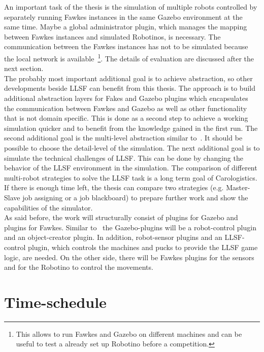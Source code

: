 \documentclass[a4paper,11pt]{article}
\begin{document}
An important task of the thesis is the simulation of multiple robots controlled by separately running Fawkes instances in the same Gazebo environment at the same time. Maybe a global administrator plugin, which manages the mapping between Fawkes instances and simulated Robotinos, is necessary. The communication between the Fawkes instances has not to be simulated because the local network is available~\footnote{This allows to run Fawkes and Gazebo on different machines and can be useful to test a already set up Robotino before a competition.}. The details of evaluation are discussed after the next section.\\
The probably most important additional goal is to achieve abstraction, so other developments beside LLSF can benefit from this thesis. The approach is to build additional abstraction layers for Fakes and Gazebo plugins which encapsulates the communication between Fawkes and Gazebo as well as other functionality that is not domain specific. This is done as a second step to achieve a working simulation quicker and to benefit from the knowledge gained in the first run. The second additional goal is the multi-level abstraction similar to~\cite{MultiLevelAbstraction}. It should be possible to choose the detail-level of the simulation. The next additional goal is to simulate the technical challenges of LLSF. This can be done by changing the behavior of the LLSF environment in the simulation. The comparison of different multi-robot strategies to solve the LLSF task is a long term goal of Carologistics. If there is enough time left, the thesis can compare two strategies (e.g. Master-Slave job assigning or a job blackboard) to prepare further work and show the capabilities of the simulator.\\
As said before, the work will structurally consist of plugins for Gazebo and plugins for Fawkes. Similar to~\cite{KlingenDA} the Gazebo-plugins will be a robot-control plugin and an object-creator plugin. In addition, robot-sensor plugins and an LLSF-control plugin, which controls the machines and pucks to provide the LLSF game logic,  are needed. On the other side, there will be Fawkes plugins  for the sensors and for the Robotino to control the movements.

\section{Time-schedule}
\end{document}
